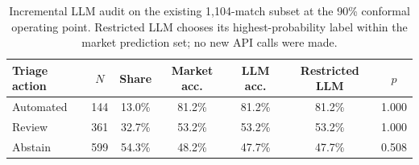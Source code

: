 \begin{table}[tbp]
\centering
\footnotesize
\setlength{\tabcolsep}{5pt}
\caption{Incremental LLM audit on the existing 1,104-match subset at the 90\% conformal operating point. Restricted LLM chooses its highest-probability label within the market prediction set; no new API calls were made.}
\label{tab:llm-triage}
\begin{tabular}{lcccccc}
\toprule
Triage action & $N$ & Share & Market acc. & LLM acc. & Restricted LLM & $p$ \\
\midrule
Automated & 144 & 13.0\% & 81.2\% & 81.2\% & 81.2\% & 1.000 \\
Review & 361 & 32.7\% & 53.2\% & 53.2\% & 53.2\% & 1.000 \\
Abstain & 599 & 54.3\% & 48.2\% & 47.7\% & 47.7\% & 0.508 \\
\bottomrule
\end{tabular}
\end{table}
